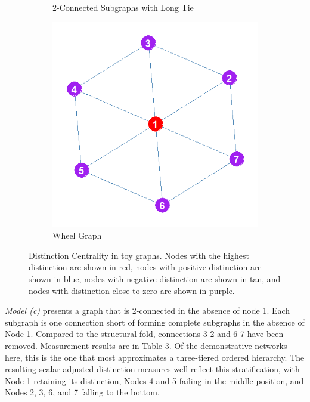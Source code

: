 \documentclass[12pt]{article}
\begin{document}
\begin{figure}
\begin{subfigure}[b]{0.35\textwidth}
            \caption{2-Connected Subgraphs with Long Tie}
            \label{fig:inter}
    \end{subfigure}
    \begin{subfigure}[b]{0.35\textwidth}
        \includegraphics[width=1.0\textwidth]{Plots/Toys/wheel.png}
            \caption{Wheel Graph}
            \label{fig:wheel}
    \end{subfigure}

    \caption{Distinction Centrality in toy graphs. Nodes with the highest distinction are shown in red, nodes with positive distinction are shown in blue, nodes with negative distinction are shown in tan, and nodes with distinction close to zero are shown in purple.}
    \label{fig:toys}
\end{figure}

\textit{Model (c)} presents a graph that is 2-connected in the absence of node 1. Each subgraph is one connection short of forming complete subgraphs in the absence of Node 1. Compared to the structural fold, connections 3-2 and 6-7 have been removed. Measurement results are in Table 3. Of the demonstrative networks here, this is the one that most approximates a three-tiered ordered hierarchy. The resulting scalar adjusted distinction measures well reflect this stratification, with Node 1 retaining its distinction, Nodes 4 and 5 failing in the middle position, and Nodes 2, 3, 6, and 7 falling to the bottom. 
\end{document}
